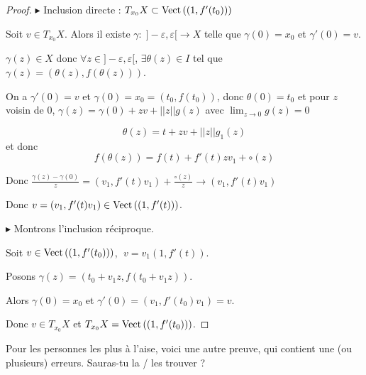 \begin{proof}
    $\blacktriangleright$ Inclusion directe : $T_{x_0}X \subset \operatorname{Vect} \,((1, f'(t_0)))$

    Soit $v \in T_{x_0}X$. Alors il existe $\gamma : \; ]- \varepsilon, \varepsilon[ \to X$ telle que 
    $\gamma(0) = x_0$ et $\gamma'(0) = v$.

    $\gamma(z) \in X$ donc $\forall z \in ]- \varepsilon, \varepsilon[$, 
    $\exists \theta(z) \in I$ tel que $\gamma(z) = (\theta(z), f(\theta(z)))$.

    On a $\gamma'(0) = v$ et $\gamma(0) = x_0 = (t_0, f(t_0))$, donc $\theta(0) = t_0$ 
    et pour $z$ voisin de $0$, $\gamma(z) = \gamma(0) + zv + ||z|| g(z)$ avec
    $\displaystyle \lim_{z \to 0} g(z) = 0$

    $$\theta(z) = t + z v + ||z|| g_1(z)$$ et donc $$f(\theta(z)) = f(t) + f'(t)z v_1 + \circ (z)$$ 

    Donc $\displaystyle \frac{\gamma(z) - \gamma(0)} z = (v_1, f'(t) v_1) + \frac{\circ(z)} z \to (v_1, f'(t) v_1)$

    Donc $v = (v_1, f'(t) v_1) \in \operatorname{Vect} \,((1, f'(t)))$.

    \lvspace
    
    $\blacktriangleright$ Montrons l'inclusion réciproque. 
    
    Soit $v \in \operatorname{Vect} \,((1, f'(t_0)))$, $\; v = v_1 (1, f'(t))$.

    Posons $\gamma(z) = (t_0 + v_1 z, f(t_0 + v_1 z))$.

    Alors $\gamma(0) = x_0$ et $\gamma'(0) = (v_1, f'(t_0) v_1) = v$.

    Donc $v \in T_{x_0}X$ et $T_{x_0}X = \operatorname{Vect} \,((1, f'(t_0)))$.
\end{proof}

Pour les personnes les plus à l'aise, voici une autre preuve, qui contient une (ou plusieurs) erreurs. 
Sauras-tu la / les trouver ?

